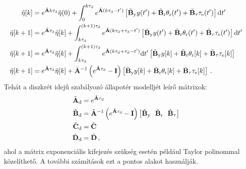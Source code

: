 \begin{align}
    \begin{split}
        \tilde{\mathbf{\eta}}[k] &= e^{\tilde {\mathbf{A}} k\tau_{\mathrm{d}}}\tilde{\mathbf{\eta}}(0) + \int_{0}^{k\tau_{\mathrm{d}}} e^{\tilde {\mathbf{A}} (k\tau_{\mathrm{d}}-t')}\left[\tilde{\mathbf{B}}_{\mathrm{y}} y(t') + 
        \tilde{\mathbf{B}}_{\mathrm{r}} \theta_{\mathrm{r}}(t') +
        \tilde{\mathbf{B}}_{\mathrm{\tau}} \tau_{\mathrm{e}}(t')\right]\mathrm{d}t' \\
        \tilde{\mathbf{\eta}}[k+1] &= e^{\tilde {\mathbf{A}}\tau_{\mathrm{d}}}\tilde{\mathbf{\eta}}[k] + \int_{k\tau_{\mathrm{d}}}^{(k+1)\tau_{\mathrm{d}}} e^{\tilde {\mathbf{A}} (k\tau_{\mathrm{d}} + \tau_{\mathrm{d}}-t')}\left[\tilde{\mathbf{B}}_{\mathrm{y}} y(t') + 
        \tilde{\mathbf{B}}_{\mathrm{r}} \theta_{\mathrm{r}}(t') +
        \tilde{\mathbf{B}}_{\mathrm{\tau}} \tau_{\mathrm{e}}(t')\right] \mathrm{d}t' \\
        \tilde{\mathbf{\eta}}[k+1] &= e^{\tilde {\mathbf{A}}\tau_{\mathrm{d}}}\tilde{\mathbf{\eta}}[k] + \int_{k\tau_{\mathrm{d}}}^{(k+1)\tau_{\mathrm{d}}} e^{\tilde {\mathbf{A}} (k\tau_{\mathrm{d}} + \tau_{\mathrm{d}}-t')}\mathrm{d}t'\left[\tilde{\mathbf{B}}_{\mathrm{y}} y[k] + 
        \tilde{\mathbf{B}}_{\mathrm{r}} \theta_{\mathrm{r}}[k] +
        \tilde{\mathbf{B}}_{\mathrm{\tau}} \tau_{\mathrm{e}}[k]\right] \\
        \tilde{\mathbf{\eta}}[k+1] &= e^{\tilde {\mathbf{A}}\tau_{\mathrm{d}}}\tilde{\mathbf{\eta}}[k] + \tilde{\mathbf{A}}^{-1}\left(e^{\tilde {\mathbf{A}}\tau_{\mathrm{d}}}-\mathbf{I}\right)\left[\tilde{\mathbf{B}}_{\mathrm{y}} y[k] + 
        \tilde{\mathbf{B}}_{\mathrm{r}} \theta_{\mathrm{r}}[k] +
        \tilde{\mathbf{B}}_{\mathrm{\tau}} \tau_{\mathrm{e}}[k]\right]\,.
    \end{split}        
\end{align}
Tehát a diszkrét idejű szabályozó állapotér modelljét leírő mátrixok:
\begin{align}\label{eq:discrete_controller_matrices}
    \begin{split}
        \tilde{\mathbf{A}}_{\mathrm{d}} &= e^{\tilde {\mathbf{A}}\tau_{\mathrm{d}}} \\
        \tilde{\mathbf{B}}_{\mathrm{d}} &= \tilde{\mathbf{A}}^{-1}\left(e^{\tilde {\mathbf{A}}\tau_{\mathrm{d}}}-\mathbf{I}\right)\left[\tilde{\mathbf{B}}_{\mathrm{y}}~~\tilde{\mathbf{B}}_{\mathrm{r}}~~\tilde{\mathbf{B}}_{\mathrm{\tau}}\right] \\
        \tilde{\mathbf{C}}_{\mathrm{d}} &= \tilde{\mathbf{C}} \\
        \tilde{\mathbf{D}}_{\mathrm{d}} &= \tilde{\mathbf{D}} \,,
    \end{split}        
\end{align}
ahol a mátrix exponenciális kifejezés szükség esetén például Taylor polinommal közelíthető. A további számítások ezt 
a pontos alakot használják.

